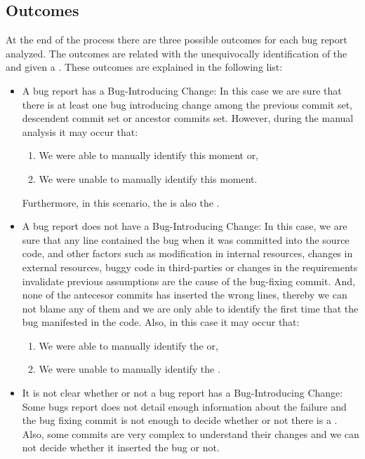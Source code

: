 \documentclass[a4paper, 12pt]{book}
\begin{document}
\subsection{Outcomes}

At the end of the process there are three possible outcomes for each bug report analyzed. The outcomes are related with the unequivocally identification of the \BIC and \FFC given a \BFC.
These outcomes are explained in the following list:  %

\begin{itemize}
	\item A bug report has a Bug-Introducing Change: In this case we are sure that there is at least one bug introducing change among the previous commit set, descendent commit set or ancestor commits set. However, during the manual analysis it may occur that:
		\begin{enumerate}
			\item We were able to manually identify this moment or,
			\item We were unable to manually identify this moment.
		\end{enumerate}
		Furthermore, in this scenario, the \BIC is also the \FFC.
	\item A bug report does not have a Bug-Introducing Change: In this case, we are sure that any line contained the bug when it was committed into the source code, and other factors such as modification in internal resources, changes in external resources, buggy code in third-parties or changes in the requirements invalidate previous assumptions are the cause of the bug-fixing commit. And, none of the antecesor commits has inserted the wrong lines, thereby we can not blame any of them and we are only able to identify the first time that the bug manifested in the code. Also, in this case it may occur that:
	\begin{enumerate}
			\item We were able to manually identify the \FFC or,
			\item We were unable to manually identify the \FFC.
		\end{enumerate}
	\item It is not clear whether or not a bug report has a Bug-Introducing Change: Some bugs report does not detail enough information about the failure and the bug fixing commit is not enough to decide whether or not there is a \BIC. Also, some commits are very complex to understand their changes and we can not decide whether it inserted the bug or not.

\end{itemize}
\end{document}

